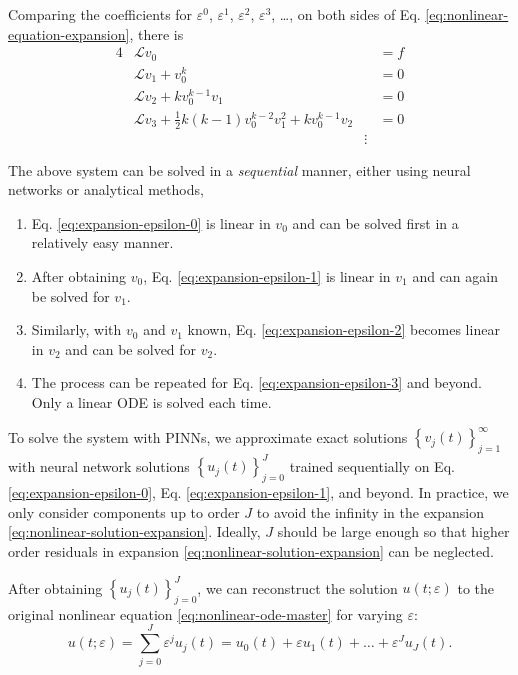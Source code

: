 \documentclass{article}
\renewcommand{\L}{\mathcal{L}}
\begin{document}
    Comparing the coefficients for $\varepsilon^0$, $\varepsilon^1$, $\varepsilon^2$, $\varepsilon^3$, \dots, on both sides of Eq. \ref{eq:nonlinear-equation-expansion}, there is
    \begin{alignat}{4}
        &\L v_0 &&= f \label{eq:expansion-epsilon-0}\\
        &\L v_1 + v_0^k &&= 0 \label{eq:expansion-epsilon-1}\\
        &\L v_2 + k v_0^{k-1}v_1 &&= 0 \label{eq:expansion-epsilon-2} \\
        &\L v_3 + \frac{1}{2}k(k-1)v_0^{k-2}v_1^2 + k v_0^{k-1}v_2 &&= 0 \label{eq:expansion-epsilon-3}\\
        &&\vdots &\nonumber
    \end{alignat}

    The above system can be solved in a \textit{sequential} manner, either using neural networks or analytical methods,
    \begin{enumerate}
        \item Eq. \ref{eq:expansion-epsilon-0} is linear in $v_0$ and can be solved first in a relatively easy manner. 
        \item After obtaining $v_0$, Eq. \ref{eq:expansion-epsilon-1} is linear in $v_1$ and can again be solved for $v_1$. 
        \item Similarly, with $v_0$ and $v_1$ known, Eq. \ref{eq:expansion-epsilon-2} becomes linear in $v_2$ and can be solved for $v_2$.
        \item The process can be repeated for Eq. \ref{eq:expansion-epsilon-3} and beyond. Only a linear ODE is solved each time.
    \end{enumerate}

    To solve the system with PINNs, we approximate exact solutions $\left\{v_j(t)\right\}_{j=1}^{\infty}$ with neural network solutions $\left\{u_j(t)\right\}_{j=0}^{J}$ trained sequentially on Eq. \ref{eq:expansion-epsilon-0}, Eq. \ref{eq:expansion-epsilon-1}, and beyond. 
    In practice, we only consider components up to order $J$ to avoid the infinity in the expansion \ref{eq:nonlinear-solution-expansion}. 
    Ideally, $J$ should be large enough so that higher order residuals in expansion \ref{eq:nonlinear-solution-expansion} can be neglected.

    After obtaining $\left\{u_j(t)\right\}_{j=0}^{J}$, we can reconstruct the solution $u(t;\varepsilon)$ to the original nonlinear equation \ref{eq:nonlinear-ode-master} for varying $\varepsilon$:
    \begin{equation}\label{eq:nonlinear-network-expansion}
        u(t;\varepsilon) = \sum_{j=0}^{J} \varepsilon^j u_j(t) = u_0(t) + \varepsilon u_1(t) + \dots + \varepsilon^J u_J(t).
    \end{equation}
\end{document}
